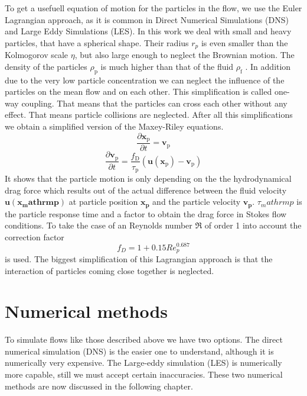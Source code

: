 \documentclass[a4paper,10pt]{article}
\renewcommand*\vec[1]{\boldsymbol{#1}}
\numberwithin{equation}{section} %
\begin{document}
To get a usefuell equation of motion for the particles in the flow, we use the Euler Lagrangian approach, as it is common in Direct Numerical Simulations (DNS) and Large Eddy Simulations (LES).
In this work we deal with small and heavy particles, that have a spherical shape. Their radius $ r_p $ is even smaller than the Kolmogorov scale $ \eta $, but also large enough to neglect the Brownian motion. The density of the particles $ \rho_\mathrm{p} $ is much higher than that of the fluid $ \rho_\mathrm{f} $ . In addition due to the very low particle concentration we can neglect the influence of the particles on the mean flow and on each other. This simplification is called one-way coupling. That means that the particles can cross each other without any effect. That means particle collisions are neglected.
After all this simplifications we obtain a simplified version of the Maxey-Riley equations. 
\begin{equation}
 \frac{\partial{\vec{x_\mathrm{p}}}}{\partial{t}} = \vec{v_\mathrm{p}}
\end{equation}
\nomenclature{$\vec{x_\mathrm{p}}$}{Particle position}
\nomenclature{$\vec{v_\mathrm{p}}$}{Particle velocity}
\begin{equation}
 \frac{\partial{\vec{v_\mathrm{p}}}}{\partial{t}} = \frac{f_\mathrm{D}}{\tau_\mathrm{p}} (\vec{u(x_\mathrm{p})} - \vec{v_\mathrm{p}})
 \end{equation}
 It shows that the particle motion is only depending on the the hydrodynamical drag force which results out of the actual difference between the fluid velocity $\vec{u(x_mathrm{p})}$ at particle position $\vec{x_p}$ and the particle velocity $\vec{v_p}$.
 $\tau_mathrm{p}$ is the particle response time and a factor to obtain the drag force in Stokes flow conditions.
 To take the case of an Reynolds number $\Re$ of order 1 into account the correction factor 
 \begin{equation}
 f_D = 1 + 0.15 Re_p^\mathrm{0.687} 
 \end{equation}
 is used.
The biggest simplification of this Lagrangian approach is that the interaction of particles coming close together is neglected.
\pagebreak
\section{Numerical methods} %
To simulate flows like those described above we have two options. The direct numerical simulation (DNS) is the easier one to understand, although it is numerically very expensive. The Large-eddy simulation (LES) is numerically more capable, still we must accept certain inaccuracies. These two numerical methods are now discussed in the following chapter.
\end{document}
